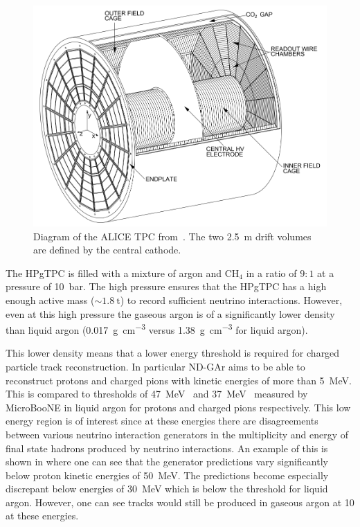 \begin{figure}[h]
  \centering
  \includegraphics[width=.8\linewidth]{files/figures/dune_detector/aliceTPC}
  \caption[Diagram of the ALICE TPC]{Diagram of the ALICE TPC from~\cite{alicePaper}. The two \SI{2.5}{\metre} drift volumes are defined by the central cathode.}
  \label{fig:aliceTPC}
\end{figure}

The HPgTPC is filled with a mixture of argon and $\text{CH}_{4}$ in a ratio of $9:1$ at a pressure of \SI{10}{\bar}.
The high pressure ensures that the HPgTPC has a high enough active mass ($\sim\SI{1.8}{\tonne}$) to record sufficient neutrino interactions.
However, even at this high pressure the gaseous argon is of a significantly lower density than liquid argon (\SI{0.017}{\gram\per\cubic\centi\metre} versus \SI{1.38}{\gram\per\cubic\centi\metre} for liquid argon).

This lower density means that a lower energy threshold is required for charged particle track reconstruction.
In particular ND-GAr aims to be able to reconstruct protons and charged pions with kinetic energies of more than \SI{5}{\mega\electronvolt}.
This is compared to thresholds of \SI{47}{\mega\electronvolt}~\cite{uBooneProtonThreshold} and \SI{37}{\mega\electronvolt}~\cite{uBoonePionThreshold} measured by MicroBooNE in liquid argon for protons and charged pions respectively.
This low energy region is of interest since at these energies there are disagreements between various neutrino interaction generators in the multiplicity and energy of final state hadrons produced by neutrino interactions.
An example of this is shown in  where one can see that the generator predictions vary significantly below proton kinetic energies of \SI{50}{\mega\electronvolt}.
The predictions become especially discrepant below energies of \SI{30}{\mega\electronvolt} which is below the threshold for liquid argon.
However, one can see tracks would still be produced in gaseous argon at \SI{10}{\atmosphere} at these energies.

